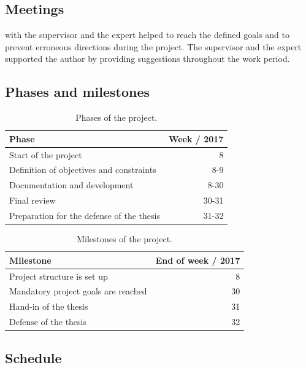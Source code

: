\documentclass[%
    a4paper,    %
    justified,  %
    nobib,      %
    openany     %
]{tufte-book}
\makeatletter
\renewcommand{\label}[1]{\@tufte@label{##1}}%
\makeatother
\begin{document}
\subsection{Meetings}
\label{subsec:meetings}

 with the supervisor and the expert helped to reach
the defined goals and to prevent erroneous directions during the project. The
supervisor and the expert supported the author by providing suggestions
throughout the work period. 

\subsection{Phases and milestones}
\label{subsec:project-phases-milestones}

\begin{table}[h]
  \caption{Phases of the project.}
  \begin{tabularx}{\textwidth}{Xr}
    \toprule
    \textbf{Phase}   & \textbf{Week / 2017} \\
    \midrule
    Start of the project & 8 \\
    Definition of objectives and constraints & 8-9 \\
    Documentation and development & 8-30 \\
    Final review & 30-31 \\
    Preparation for the defense of the thesis & 31-32 \\
    \bottomrule
  \end{tabularx}
\end{table}

\begin{table}[h]
  \caption{Milestones of the project.}
  \begin{tabularx}{\textwidth}{Xr}
    \toprule
    \textbf{Milestone}   & \textbf{End of week / 2017} \\
    \midrule
    Project structure is set up & 8 \\
    Mandatory project goals are reached & 30 \\
    Hand-in of the thesis & 31 \\
    Defense of the thesis & 32 \\
    \bottomrule
  \end{tabularx}
\end{table}

\newpage{}

\subsection{Schedule}
\label{subsec:project-schedule}
\end{document}
